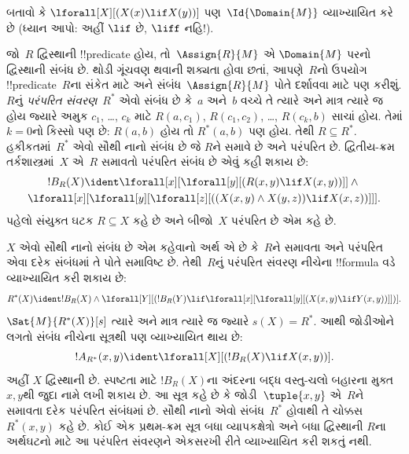 \documentclass[../../../include/open-logic-section]{subfiles}
\begin{document}
\begin{prob}
બતાવો કે $\lforall[X][(X(x) \lif X(y))]$ પણ~$\Id{\Domain{M}}$
વ્યાખ્યાયિત કરે છે (ધ્યાન આપો: અહીં $\lif$ છે, $\liff$ નહિ!).
\end{prob}

\begin{ex}
જો~$R$ દ્વિસ્થાની !!{predicate} હોય, તો~$\Assign{R}{M}$ એ
$\Domain{M}$ પરનો દ્વિસ્થાની સંબંધ છે. થોડી ગૂંચવણ થવાની શક્યતા
હોવા છતાં, આપણે~$R$નો ઉપયોગ !!{predicate}~$R$ના સંકેત માટે અને
સંબંધ~$\Assign{R}{M}$ પોતે દર્શાવવા માટે પણ કરીશું. $R$નું
\emph{પરંપરિત સંવરણ}~$R^*$ એવો સંબંધ છે કે~$a$ અને~$b$ વચ્ચે તે
ત્યારે અને માત્ર ત્યારે જ હોય જ્યારે અમુક $c_1$, \dots, $c_k$
માટે $R(a,c_1)$, $R(c_1, c_2)$, \dots, $R(c_k,b)$ સાચાં હોય.
તેમાં $k = 0$નો કિસ્સો પણ છે: $R(a,b)$ હોય તો $R^*(a,b)$ પણ હોય.
તેથી $R \subseteq R^*$. હકીકતમાં~$R^*$ એવો સૌથી નાનો સંબંધ છે જે
$R$ને સમાવે છે અને પરંપરિત છે. દ્વિતીય-ક્રમ તર્કશાસ્ત્રમાં~$X$ એ~$R$
સમાવતો પરંપરિત સંબંધ છે એવું કહી શકાય છે:
\begin{multline*}
  !B_R(X) \ident \lforall[x][\lforall[y][(R(x,y) \lif X(x, y))]] \land {}\\
\lforall[x][\lforall[y][\lforall[z][((X(x,y) \land X(y,z)) \lif X(x,
      z))]]].
\end{multline*}
પહેલો સંયુક્ત ઘટક $R \subseteq X$ કહે છે અને બીજો~$X$ પરંપરિત છે એમ કહે
છે.

$X$ એવો સૌથી નાનો સંબંધ છે એમ કહેવાનો અર્થ એ છે કે~$R$ને સમાવતા
અને પરંપરિત એવા દરેક સંબંધમાં તે પોતે સમાવિષ્ટ છે. તેથી~$R$નું
પરંપરિત સંવરણ નીચેના !!{formula} વડે વ્યાખ્યાયિત કરી શકાય છે:
\[
R^*(X) \ident !B_R(X) \land \lforall[Y][(!B_R(Y) \lif
  \lforall[x][\lforall[y][(X(x, y) \lif Y(x,y))]])].
\]
$\Sat{M}{R^*(X)}[s]$ ત્યારે અને માત્ર ત્યારે જ જ્યારે $s(X) = R^*$.
આથી જોડીઓને લગતો સંબંધ નીચેના સૂત્રથી પણ વ્યાખ્યાયિત થાય છે:
\[
!A_{R^*}(x,y) \ident
\lforall[X][(!B_R(X) \lif X(x,y))].
\]
અહીં $X$ દ્વિસ્થાની છે. સ્પષ્ટતા માટે $!B_R(X)$ના અંદરના બદ્ધ
વસ્તુ-ચલો બહારના મુક્ત $x,y$થી જુદા નામે લખી શકાય છે. આ સૂત્ર કહે છે કે
જોડી~$\tuple{x,y}$ એ~$R$ને સમાવતા દરેક પરંપરિત સંબંધમાં છે.
સૌથી નાનો એવો સંબંધ~$R^*$ હોવાથી તે ચોક્કસ $R^*(x,y)$ કહે છે.
કોઈ એક પ્રથમ-ક્રમ સૂત્ર બધા વ્યાપકક્ષેત્રો અને બધા દ્વિસ્થાની
$R$ના અર્થઘટનો માટે આ પરંપરિત સંવરણને એકસરખી રીતે વ્યાખ્યાયિત
કરી શકતું નથી.
\end{ex}
\end{document}
